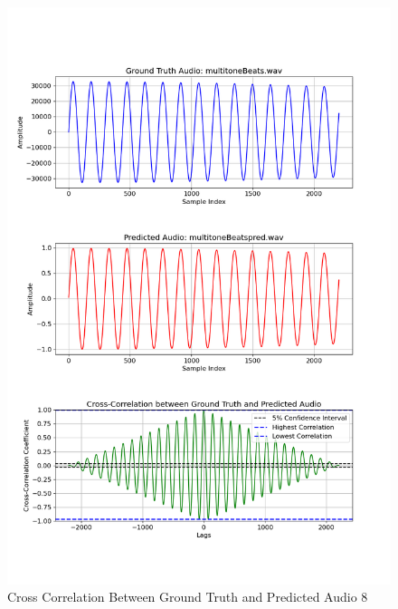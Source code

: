 \documentclass{ioereport}
\begin{document}
    \begin{figure}[H]
        \centering
        \includegraphics[width=\linewidth]{assets/crosscorrelation/cross_correlation_multitoneBeats.wav_multitoneBeatspred.wav.png}
        \caption{Cross Correlation Between Ground Truth and Predicted Audio 8}
        \label{fig:cross-correlation-8}
    \end{figure}
\end{document}
